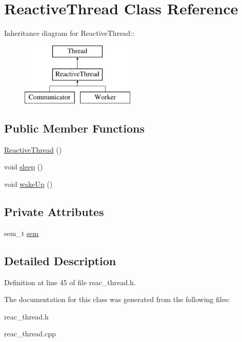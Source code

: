 \hypertarget{classReactiveThread}{
\section{Reactive\-Thread Class Reference}
\label{classReactiveThread}
}
Inheritance diagram for Reactive\-Thread::\begin{figure}[H]
\begin{center}
\leavevmode
\includegraphics[height=3cm]{classReactiveThread}
\end{center}
\end{figure}
\subsection*{Public Member Functions}
\begin{CompactItemize}
\item 
\hypertarget{classReactiveThread_77381649429941c99a3e3d568113d6cf}{
\hyperlink{classReactiveThread_77381649429941c99a3e3d568113d6cf}{Reactive\-Thread} ()}
\label{classReactiveThread_77381649429941c99a3e3d568113d6cf}

\item 
\hypertarget{classReactiveThread_8263c2a32d8c99a49a05f1a7717d4262}{
void \hyperlink{classReactiveThread_8263c2a32d8c99a49a05f1a7717d4262}{sleep} ()}
\label{classReactiveThread_8263c2a32d8c99a49a05f1a7717d4262}

\item 
\hypertarget{classReactiveThread_a724a54575de10f09cc03ab7aa4e59ce}{
void \hyperlink{classReactiveThread_a724a54575de10f09cc03ab7aa4e59ce}{wake\-Up} ()}
\label{classReactiveThread_a724a54575de10f09cc03ab7aa4e59ce}

\end{CompactItemize}
\subsection*{Private Attributes}
\begin{CompactItemize}
\item 
\hypertarget{classReactiveThread_915e5a42dc8cb1bcf6738d5fe883a4e7}{
sem\_\-t \hyperlink{classReactiveThread_915e5a42dc8cb1bcf6738d5fe883a4e7}{sem}}
\label{classReactiveThread_915e5a42dc8cb1bcf6738d5fe883a4e7}

\end{CompactItemize}


\subsection{Detailed Description}




Definition at line 45 of file reac\_\-thread.h.

The documentation for this class was generated from the following files:\begin{CompactItemize}
\item 
reac\_\-thread.h\item 
reac\_\-thread.cpp\end{CompactItemize}
